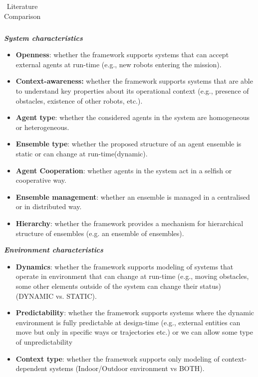 \documentclass[journal]{IEEEtran}
\theoremstyle{definition}
\begin{document}
\begin{table}[bth]
\begin{tabular}{|c|c|c|c|c|c|c|c|c|c|c|c|c|}
\hline
\end{tabular}
\caption{Literature Comparison}
\label{tab:literature}
\end{table}



\textbf{\textit{System characteristics}}

\begin{itemize}
\item \textbf{Openness}: whether the framework supports systems that can accept external agents at run-time (e.g., new robots entering the mission). 
\item \textbf{Context-awareness:} whether the framework supports systems that are able to understand key properties about its operational context (e.g., presence of obstacles, existence of other robots, etc.).
	\item

\textbf{Agent type}: whether the considered agents in the system are homogeneous or heterogeneous. 

\item \textbf{Ensemble type}: whether the proposed structure of an agent ensemble is static or can change at run-time(dynamic). %
	\item \label{lbl:beha}
\textbf{Agent Cooperation}: whether agents in the system act in a selfish or cooperative way.
	\item \label{lbl:confl}
\textbf{Ensemble management}: whether an ensemble is managed in a centralised or in distributed way.
	\item \label{lbl:hierarchy}
\textbf{Hierarchy}: whether the framework provides a mechanism for hierarchical structure of ensembles (e.g. an ensemble of ensembles).
\end{itemize}

\textbf{\textit{Environment characteristics}}
\begin{itemize}
\item \textbf{Dynamics}: whether the framework supports modeling of systems that operate in environment that can change at run-time (e.g., moving obstacles, some other elements outside of the system can change their status) (DYNAMIC vs. STATIC).
\item \textbf{Predictability}: whether the framework supports systems where the dynamic environment is fully predictable at design-time (e.g., external entities can move but only in specific ways or trajectories etc.) or we can allow some type of unpredictability
\item \textbf{Context type}: whether the framework supports only modeling of context-dependent systems (Indoor/Outdoor environment vs BOTH).
\end{itemize}
\end{document}
